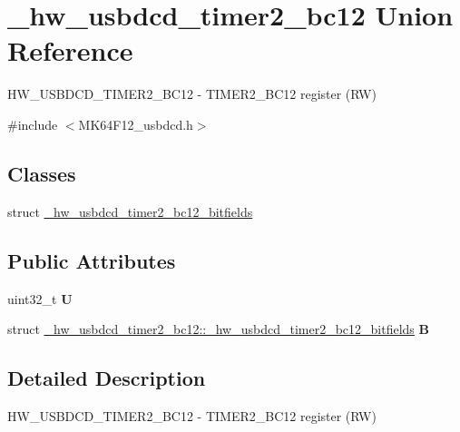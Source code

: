 \hypertarget{union__hw__usbdcd__timer2__bc12}{}\section{\+\_\+hw\+\_\+usbdcd\+\_\+timer2\+\_\+bc12 Union Reference}
\label{union__hw__usbdcd__timer2__bc12}


H\+W\+\_\+\+U\+S\+B\+D\+C\+D\+\_\+\+T\+I\+M\+E\+R2\+\_\+\+B\+C12 -\/ T\+I\+M\+E\+R2\+\_\+\+B\+C12 register (RW)  




{\ttfamily \#include $<$M\+K64\+F12\+\_\+usbdcd.\+h$>$}

\subsection*{Classes}
\begin{DoxyCompactItemize}
\item 
struct \hyperlink{struct__hw__usbdcd__timer2__bc12_1_1__hw__usbdcd__timer2__bc12__bitfields}{\+\_\+hw\+\_\+usbdcd\+\_\+timer2\+\_\+bc12\+\_\+bitfields}
\end{DoxyCompactItemize}
\subsection*{Public Attributes}
\begin{DoxyCompactItemize}
\item 
uint32\+\_\+t {\bfseries U}\hypertarget{union__hw__usbdcd__timer2__bc12_a83173bfa16224f6fffb920f1959c262a}{}\label{union__hw__usbdcd__timer2__bc12_a83173bfa16224f6fffb920f1959c262a}

\item 
struct \hyperlink{struct__hw__usbdcd__timer2__bc12_1_1__hw__usbdcd__timer2__bc12__bitfields}{\+\_\+hw\+\_\+usbdcd\+\_\+timer2\+\_\+bc12\+::\+\_\+hw\+\_\+usbdcd\+\_\+timer2\+\_\+bc12\+\_\+bitfields} {\bfseries B}\hypertarget{union__hw__usbdcd__timer2__bc12_a9ae9889f29c6098c776b933e50a1505b}{}\label{union__hw__usbdcd__timer2__bc12_a9ae9889f29c6098c776b933e50a1505b}

\end{DoxyCompactItemize}


\subsection{Detailed Description}
H\+W\+\_\+\+U\+S\+B\+D\+C\+D\+\_\+\+T\+I\+M\+E\+R2\+\_\+\+B\+C12 -\/ T\+I\+M\+E\+R2\+\_\+\+B\+C12 register (RW) 

